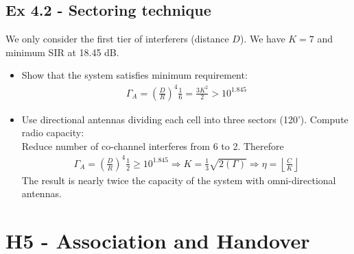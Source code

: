\subsection*{Ex 4.2 - Sectoring technique}
We only consider the first tier of interferers (distance $D$). We have $K = 7$ and minimum SIR at 18.45 dB.
\begin{itemize}
	\item Show that the system satisfies minimum requirement:
	\begin{align*}
		\Gamma_A = (\frac{D}{R})^4 \frac{1}{6} = \frac{3 K^2}{2} > 10^{1.845}
	\end{align*}
	\item Use directional antennas dividing each cell into three sectors (120'). Compute radio capacity: \\
	Reduce number of co-channel interferes from 6 to 2. Therefore
	\begin{align*}
		\Gamma_A = (\frac{D}{R})^4 \frac{1}{2} \geq 10^{1.845} \Rightarrow K = \frac{1}{3} \sqrt{2 (\Gamma)} \Rightarrow \eta = \left \lfloor \frac{C}{K} \right \rfloor
	\end{align*}
	The result is nearly twice the capacity of the system with omni-directional antennas.
\end{itemize}



\section*{H5 - Association and Handover}

